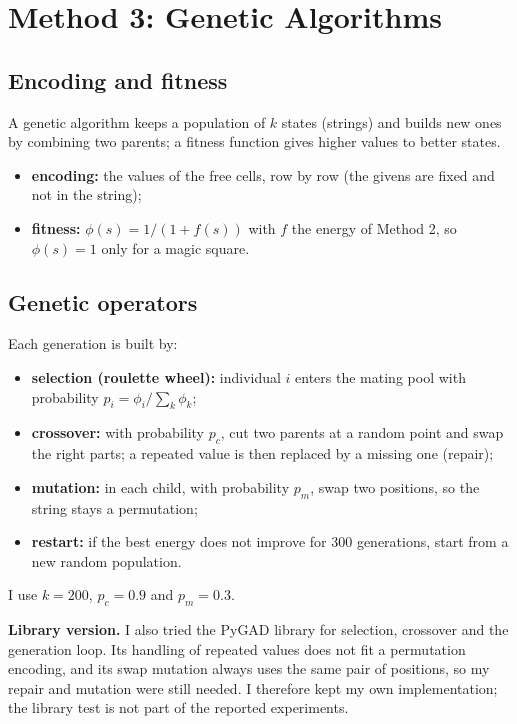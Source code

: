 \documentclass[11pt,a4paper]{article}
\begin{document}
\section{Method 3: Genetic Algorithms}
\label{sec:m3}

\subsection{Encoding and fitness}

A genetic algorithm \cite{slides,goldberg} keeps a population of $k$
states (strings) and builds new ones by combining two parents; a fitness
function gives higher values to better states.
\begin{itemize}[nosep]
  \item \textbf{encoding:} the values of the free cells, row by row (the
        givens are fixed and not in the string);
  \item \textbf{fitness:} $\phi(s)=1/(1+f(s))$ with $f$ the energy of
        Method 2, so $\phi(s)=1$ only for a magic square.
\end{itemize}

\subsection{Genetic operators}

Each generation is built by:
\begin{itemize}[nosep]
  \item \textbf{selection (roulette wheel):} individual $i$ enters the
        mating pool with probability $p_i=\phi_i/\sum_k \phi_k$;
  \item \textbf{crossover:} with probability $p_c$, cut two parents at a
        random point and swap the right parts; a repeated value is then
        replaced by a missing one (repair);
  \item \textbf{mutation:} in each child, with probability $p_m$, swap two
        positions, so the string stays a permutation;
  \item \textbf{restart:} if the best energy does not improve for 300
        generations, start from a new random population.
\end{itemize}
I use $k=200$, $p_c=0.9$ and $p_m=0.3$.

\textbf{Library version.} I also tried the PyGAD library for selection,
crossover and the generation loop. Its handling of repeated values does
not fit a permutation encoding, and its swap mutation always uses the same
pair of positions, so my repair and mutation were still needed. I
therefore kept my own implementation; the library test is not part of the
reported experiments.
\end{document}
